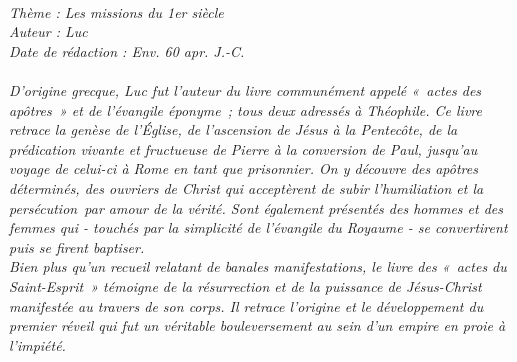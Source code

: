 \BFont
\noindent\hrulefill
\textit{
\bigskip
{\centering{}
\\Thème : Les missions du 1er siècle
\\Auteur : Luc
\\Date de rédaction : Env. 60 apr. J.-C.\\}
}
\textit{
\\D’origine grecque, Luc fut l’auteur du livre communément appelé « actes des apôtres » et de l’évangile éponyme ; tous deux adressés à Théophile. Ce livre retrace la genèse de l’Église, de l’ascension de Jésus à la Pentecôte, de la prédication vivante et fructueuse de Pierre à la conversion de Paul, jusqu’au voyage de celui-ci à Rome en tant que prisonnier. On y découvre des apôtres déterminés, des ouvriers de Christ qui acceptèrent de subir l’humiliation et la persécution par amour de la vérité. Sont également présentés des hommes et des femmes qui - touchés par la simplicité de l’évangile du Royaume - se convertirent puis se firent baptiser.
\bigskip
\\Bien plus qu’un recueil relatant de banales manifestations, le livre des « actes du Saint-Esprit » témoigne de la résurrection et de la puissance de Jésus-Christ manifestée au travers de son corps. Il retrace l’origine et le développement du premier réveil qui fut un véritable bouleversement au sein d’un empire en proie à l’impiété.\bigskip
}
\par\nobreak\noindent\hrulefill
